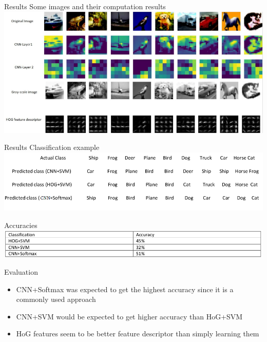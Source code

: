 \documentclass{beamer}
\begin{document}
\begin{frame}{Results}
	Some images and their computation results
	\includegraphics[width=\linewidth]{imgs}
\end{frame}

\begin{frame}{Results}
	Classification example
	\includegraphics[width=\linewidth]{pics}
	
	
	Accuracies
	\includegraphics[width=\linewidth]{table}
\end{frame}

\begin{frame}{Evaluation}
	\begin{itemize}
		\item CNN+Softmax was expected to get the highest accuracy since it is a commonly used approach
		\item CNN+SVM would be expected to get higher accuracy than HoG+SVM
		\item HoG features seem to be better feature descriptor than simply learning them 
	\end{itemize}
\end{frame}
\end{document}

